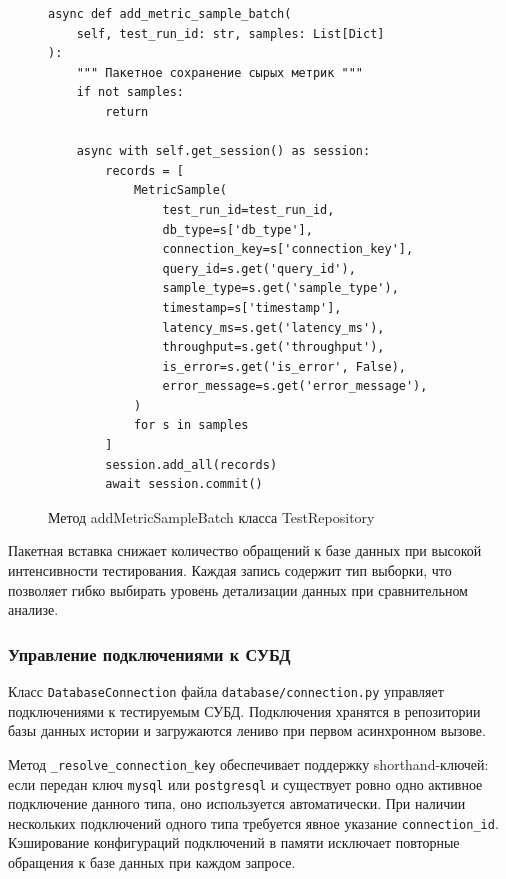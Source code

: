 \begin{figure}
    \begin{minipage}{\linewidth}
\begin{lstlisting}
async def add_metric_sample_batch(
    self, test_run_id: str, samples: List[Dict]
):
    """ Пакетное сохранение сырых метрик """
    if not samples:
        return

    async with self.get_session() as session:
        records = [
            MetricSample(
                test_run_id=test_run_id,
                db_type=s['db_type'],
                connection_key=s['connection_key'],
                query_id=s.get('query_id'),
                sample_type=s.get('sample_type'),
                timestamp=s['timestamp'],
                latency_ms=s.get('latency_ms'),
                throughput=s.get('throughput'),
                is_error=s.get('is_error', False),
                error_message=s.get('error_message'),
            )
            for s in samples
        ]
        session.add_all(records)
        await session.commit()
\end{lstlisting}
    \end{minipage}
    \caption{Метод addMetricSampleBatch класса TestRepository}
    \label{lst:save_metric_samples}
\end{figure}

Пакетная вставка снижает количество обращений к базе данных при высокой интенсивности тестирования. Каждая запись содержит тип выборки, что позволяет гибко выбирать уровень детализации данных при сравнительном анализе.

\subsubsection{Управление подключениями к СУБД}

Класс \texttt{DatabaseConnection} файла \texttt{database/connection.py} управляет подключениями к тестируемым СУБД. Подключения хранятся в репозитории базы данных истории и загружаются лениво при первом асинхронном вызове.

Метод \texttt{\_resolve\_connection\_key} обеспечивает поддержку shorthand-ключей: если передан ключ \texttt{mysql} или \texttt{postgresql} и существует ровно одно активное подключение данного типа, оно используется автоматически. При наличии нескольких подключений одного типа требуется явное указание \texttt{connection\_id}. Кэширование конфигураций подключений в памяти исключает повторные обращения к базе данных при каждом запросе.

